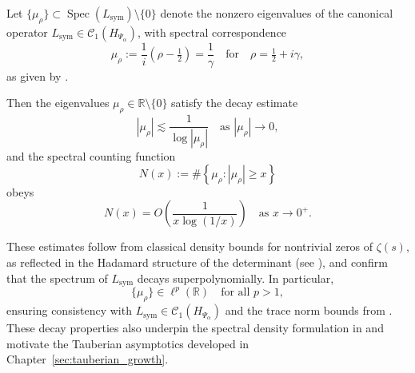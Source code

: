 \begin{lemma}
\label{lem:spectral_decay_bounds}
Let \( \{ \mu_\rho \} \subset \operatorname{Spec}(L_{\mathrm{sym}}) \setminus \{0\} \) denote the nonzero eigenvalues of the canonical operator \( L_{\mathrm{sym}} \in \mathcal{C}_1(H_{\Psi_\alpha}) \), with spectral correspondence
\[
\mu_\rho := \frac{1}{i}(\rho - \tfrac{1}{2}) = \frac{1}{\gamma}
\quad \text{for} \quad \rho = \tfrac{1}{2} + i\gamma,
\]
as given by .

Then the eigenvalues \( \mu_\rho \in \mathbb{R} \setminus \{0\} \) satisfy the decay estimate
\[
|\mu_\rho| \lesssim \frac{1}{\log |\mu_\rho|} \quad \text{as } |\mu_\rho| \to 0,
\]
and the spectral counting function
\[
N(x) := \#\left\{ \mu_\rho : |\mu_\rho| \geq x \right\}
\]
obeys
\[
N(x) = O\left( \frac{1}{x \log (1/x)} \right) \quad \text{as } x \to 0^+.
\]

\medskip
\noindent
These estimates follow from classical density bounds for nontrivial zeros of \( \zeta(s) \), as reflected in the Hadamard structure of the determinant (see ), and confirm that the spectrum of \( L_{\mathrm{sym}} \) decays superpolynomially. In particular,
\[
\{ \mu_\rho \} \in \ell^p(\mathbb{R}) \quad \text{for all } p > 1,
\]
ensuring consistency with \( L_{\mathrm{sym}} \in \mathcal{C}_1(H_{\Psi_\alpha}) \) and the trace norm bounds from . These decay properties also underpin the spectral density formulation in  and motivate the Tauberian asymptotics developed in Chapter~\ref{sec:tauberian_growth}.
\end{lemma}
